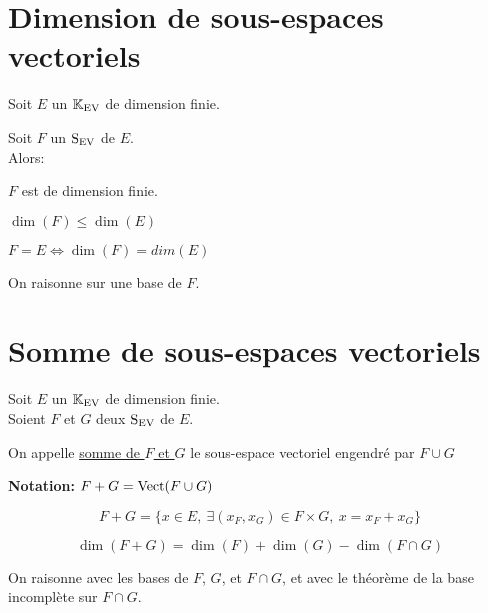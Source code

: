 \documentclass[12pt,twoside,a4paper]{article}
\author{MPSI 2}
\begin{document}
	\maketitle
	\section{Dimension de sous-espaces vectoriels}
		Soit $E$ un $\mathbb{K}_\mathrm{EV}$ de dimension finie.
		\begin{prop}
			Soit $F$ un $\mathrm{S}_\mathrm{EV}$ de $E$.\\
			Alors:
			\begin{liste}
				\item $F$ est de dimension finie.
				\item $\dim(F)\leqslant\dim(E)$
				\item $F=E\iff \dim(F)=dim(E)$
			\end{liste}
		\end{prop}
		\begin{preuve}
			On raisonne sur une base de $F$.
		\end{preuve}
	\section{Somme de sous-espaces vectoriels}
		Soit $E$ un $\mathbb{K}_\mathrm{EV}$ de dimension finie.\\
		Soient $F$ et $G$ deux $\mathrm{S}_\mathrm{EV}$ de $E$.
		\begin{defi}
			On appelle \underline{somme de $F$ et $G$} le sous-espace vectoriel engendré par $F\cup G$
		\end{defi}
		\begin{flushleft}
			\textbf{Notation:} $F+G=\mathrm{Vect}(F\cup G)$
		\end{flushleft}
		\begin{prop}
			$$F+G=\{x\in E,\ \exists(x_F,x_G)\in F\times G,\ x=x_F+x_G \}$$
		\end{prop}
		\newpage
		\begin{prop}
			$$\dim(F+G)=\dim(F)+\dim(G)-\dim(F\cap G)$$
		\end{prop}
		\begin{preuve}
			On raisonne avec les bases de $F$, $G$, et $F\cap G$, et avec le théorème de la base incomplète sur $F\cap G$.
		\end{preuve}
\end{document}
